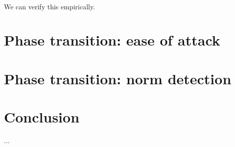 \documentclass[]{scrarticle}
\begin{document}
\paragraph{} We can verify this empirically.


\section{Phase transition: ease of attack}

\section{Phase transition: norm detection}


\section*{Conclusion}

...

\newpage
\nocite{*}


\end{document}

